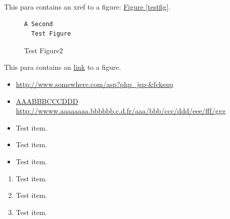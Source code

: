 \documentclass[pdftex,english,a4paper,10pt,twocolumn]{infocom}
\begin{document}
This para contains an xref to a figure: \hyperlink{testfig}{Figure {\ref*{testfig}}}.


\begin{figure}[hbt]
\begin{center}%
\hypertarget{testfig2}{}%

\begin{Verbatim}[]
A Second
  Test Figure

\end{Verbatim}
\caption{{{Test Figure2}}}
\label{testfig2}
\end{center}
\end{figure}


This para contains an \hyperlink{testfig2}{link} to a figure.
\begin{itemize}

	\item 

        \href{http://www.somewhere.com/asp?php_jsp-&fcksup?}{http://www.somewhere.com/asp?php\_jsp-\&fcksup}
      


	\item 

        \href{http://wwww.aaaaaaaa.bbbbbb.c.d.fr/aaa/bbb/ccc/ddd/eee/fff/ggg}{AAABBBCCCDDD}
        \url{http://wwww.aaaaaaaa.bbbbbb.c.d.fr/aaa/bbb/ccc/ddd/eee/fff/ggg}
      

\end{itemize}
\begin{itemize}

	\item 
Test item.


	\item 
Test item.


	\item 
Test item.

\end{itemize}
\begin{enumerate}
	\item 
Test item.


	\item 
Test item.


	\item 
Test item.


	\end{enumerate}
\end{document}
